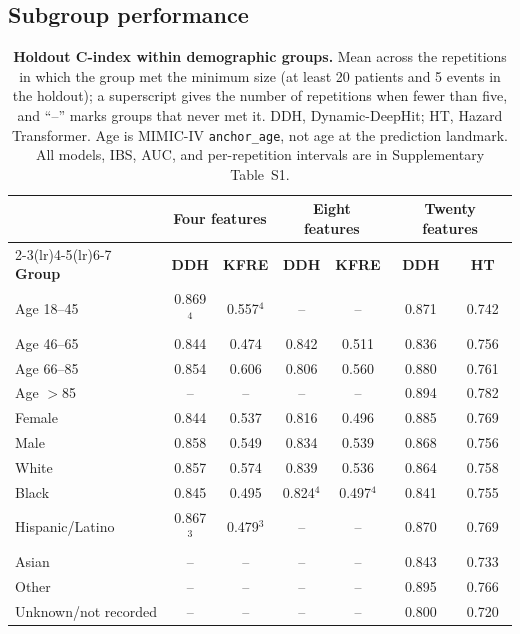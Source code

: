 \subsection{Subgroup performance}

\begin{table}[h!]
\centering
\footnotesize
\setlength{\tabcolsep}{3pt}
\begin{tabular}{@{}lcccccc@{}}
\toprule
 & \multicolumn{2}{c}{\textbf{Four features}} & \multicolumn{2}{c}{\textbf{Eight features}} & \multicolumn{2}{c}{\textbf{Twenty features}} \\
\cmidrule(lr){2-3}\cmidrule(lr){4-5}\cmidrule(lr){6-7}
\textbf{Group} & \textbf{DDH} & \textbf{KFRE} & \textbf{DDH} & \textbf{KFRE} & \textbf{DDH} & \textbf{HT} \\
\midrule
Age 18--45 & 0.869$^{4}$ & 0.557$^{4}$ & -- & -- & 0.871 & 0.742 \\
Age 46--65 & 0.844 & 0.474 & 0.842 & 0.511 & 0.836 & 0.756 \\
Age 66--85 & 0.854 & 0.606 & 0.806 & 0.560 & 0.880 & 0.761 \\
Age $>$85 & -- & -- & -- & -- & 0.894 & 0.782 \\
Female & 0.844 & 0.537 & 0.816 & 0.496 & 0.885 & 0.769 \\
Male & 0.858 & 0.549 & 0.834 & 0.539 & 0.868 & 0.756 \\
White & 0.857 & 0.574 & 0.839 & 0.536 & 0.864 & 0.758 \\
Black & 0.845 & 0.495 & 0.824$^{4}$ & 0.497$^{4}$ & 0.841 & 0.755 \\
Hispanic/Latino & 0.867$^{3}$ & 0.479$^{3}$ & -- & -- & 0.870 & 0.769 \\
Asian & -- & -- & -- & -- & 0.843 & 0.733 \\
Other & -- & -- & -- & -- & 0.895 & 0.766 \\
Unknown/not recorded & -- & -- & -- & -- & 0.800 & 0.720 \\
\bottomrule
\end{tabular}
\caption{{\bf Holdout C-index within demographic groups.} Mean across the repetitions in which the group met the minimum size (at least 20 patients and 5 events in the holdout); a superscript gives the number of repetitions when fewer than five, and ``--'' marks groups that never met it. DDH, Dynamic-DeepHit; HT, Hazard Transformer. Age is MIMIC-IV \texttt{anchor\_age}, not age at the prediction landmark. All models, IBS, AUC, and per-repetition intervals are in Supplementary Table~S1.}
\label{tab:subgroup}
\end{table}

